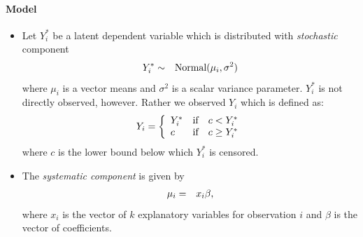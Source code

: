 \documentclass[letterpaper,10pt,english]{sphinxmanual}
\begin{document}
\paragraph{Model}
\label{zelig-tobit:model}\begin{itemize}
\item {} 
Let \(Y_i^*\) be a latent dependent variable which is distributed
with \emph{stochastic} component
\begin{gather}
\begin{split}\begin{aligned}
Y_i^* & \sim & \textrm{Normal}(\mu_i, \sigma^2) \\\end{aligned}\end{split}\notag
\end{gather}
where \(\mu_i\) is a vector means and \(\sigma^2\) is a
scalar variance parameter. \(Y_i^*\) is not directly observed,
however. Rather we observed \(Y_i\) which is defined as:
\begin{gather}
\begin{split}Y_i = \left\{
\begin{array}{lcl}
Y_i^*  &\textrm{if} & c <Y_i^* \\
c    &\textrm{if} & c \ge Y_i^*
\end{array}\right.\end{split}\notag
\end{gather}
where \(c\) is the lower bound below which \(Y_i^*\) is
censored.

\item {} 
The \emph{systematic component} is given by
\begin{gather}
\begin{split}\begin{aligned}
\mu_{i} &=& x_{i} \beta,\end{aligned}\end{split}\notag
\end{gather}
where \(x_{i}\) is the vector of \(k\) explanatory variables
for observation \(i\) and \(\beta\) is the vector of
coefficients.

\end{itemize}
\end{document}
